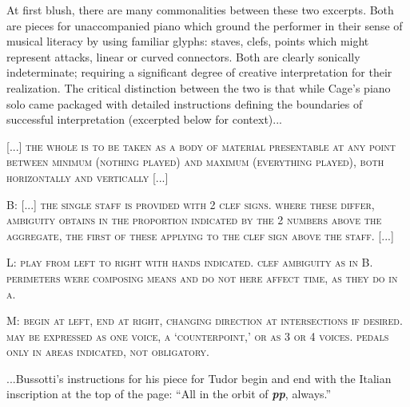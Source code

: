         At first blush, there are many commonalities between these two excerpts. Both are pieces for unaccompanied piano which ground the performer in their sense of musical literacy by using familiar glyphs: staves, clefs, points which might represent attacks, linear or curved connectors. Both are clearly sonically indeterminate; requiring a significant degree of creative interpretation for their realization. The critical distinction between the two is that while Cage's piano solo came packaged with detailed instructions defining the boundaries of successful interpretation (excerpted below for context)...

    \begin{smallquote}
        \noindent \textsc{[...] the whole is to be taken as a body of material presentable at any point between minimum (nothing played) and maximum (everything played), both horizontally and vertically [...]}
    \end{smallquote}
        \vspace{-20pt}
    \begin{smallquote}
        \noindent \lettrine[lines=2, findent=3pt, nindent=0pt]{B}{:} \textsc{[...] the single staff is provided with 2 clef signs. where these differ, ambiguity obtains in the proportion indicated by the 2 numbers above the aggregate, the first of these applying to the clef sign above the staff.} [...]
    \end{smallquote}
        \vspace{-20pt}
    \begin{smallquote}
        \noindent \lettrine[lines=2, findent=3pt, nindent=0pt]{L}{:} \textsc{play from left to right with hands indicated. clef ambiguity as in B. perimeters were composing means and do not here affect time, as they do in a.}        
    \end{smallquote}
        \vspace{-20pt}
    \begin{smallquote}
        \noindent \lettrine[lines=2, findent=3pt, nindent=0pt]{M}{:} \textsc{begin at left, end at right, changing direction at intersections if desired. may be expressed as one voice, a `counterpoint,' or as 3 or 4 voices. pedals only in areas indicated, not obligatory.}\autocite[pg. B]{Cage_1960}
    \end{smallquote}




    \noindent ...Bussotti's instructions for his piece for Tudor begin and end with the Italian inscription at the top of the page: ``All in the orbit of \textbf{\textit{pp}}, always.'' 
    
